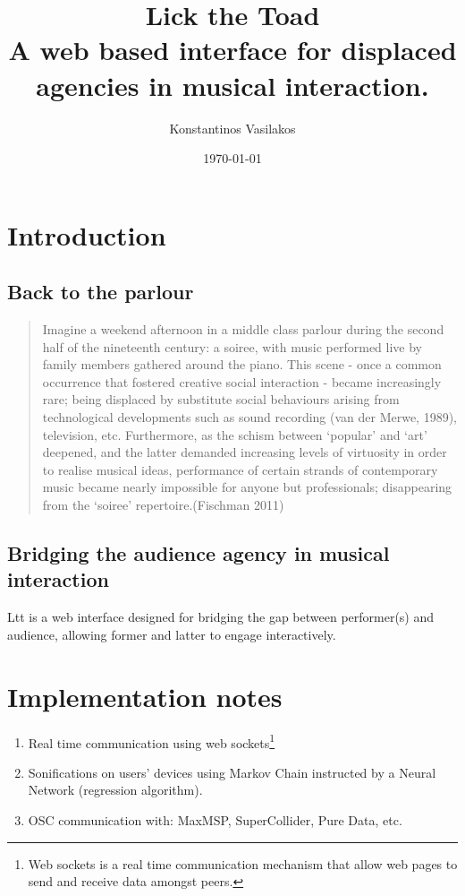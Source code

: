 \documentclass[11pt]{article}
\author{Konstantinos Vasilakos}
\date{\today}
\title{Lick the Toad\\\medskip
\large A web based interface for displaced agencies in musical interaction.}
\makeatletter
\newcommand{\citeprocitem}[2]{\hyper@linkstart{cite}{citeproc_bib_item_#1}#2\hyper@linkend}
\makeatother
\begin{document}
\maketitle
\setcounter{tocdepth}{1}
\tableofcontents



\section*{Introduction}
\label{sec:org0e01bb0}
\subsection*{Back to the parlour}
\label{sec:org4f3b557}
\begin{quote}
Imagine a weekend afternoon in a middle class parlour during the second half of the nineteenth century: a soiree, with music performed live by family members gathered around the piano. This scene - once a common occurrence that fostered creative social interaction - became increasingly rare; being displaced by substitute social behaviours arising from technological developments such as sound recording (van der Merwe, 1989), television, etc. Furthermore, as the schism between ‘popular’ and ‘art’ deepened, and the latter demanded increasing levels of virtuosity in order to realise musical ideas, performance of certain strands of contemporary music became nearly impossible for anyone but professionals; disappearing from the ‘soiree’ repertoire.(\citeprocitem{6}{Fischman 2011})
\end{quote}
\subsection*{Bridging the audience agency in musical interaction}
\label{sec:org9e9edd2}
Ltt is a web interface designed for bridging the gap between performer(s) and audience, allowing former and latter to engage interactively.
\section*{Implementation notes}
\label{sec:org38458e5}
\begin{enumerate}
\item Real time communication using web sockets\footnote{Web sockets is a real time communication mechanism that allow web pages to send and receive data amongst peers.}
\item Sonifications on users' devices using Markov Chain instructed by a Neural Network (regression algorithm).
\item OSC communication with: MaxMSP, SuperCollider, Pure Data, etc.
\end{enumerate}
\end{document}
